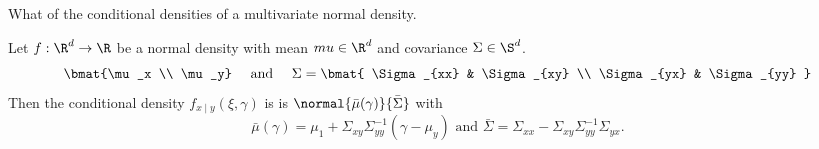 

What of the conditional densities of
a multivariate normal density.


\begin{prop}
  Let $f: \R^d \to \R$ be a normal density with
  mean $mu \in \R^d$ and covariance $\Sigma \in \S^d$.
\[
  \bmat{\mu_x \\ \mu_y} \quad \text{ and } \quad
  \Sigma = \bmat{
    \Sigma_{xx} & \Sigma_{xy} \\
    \Sigma_{yx} & \Sigma_{yy}
  }
\]
  Then the conditional density $f_{x \mid y}(\xi, \gamma)$ is
  is $\normal{\bar{\mu}(\gamma)}{\bar{\Sigma}}$
with
  \[
    \bar{\mu}(\gamma) = \mu_1 + \Sigma_{xy}\Sigma_{yy}^{-1}(\gamma - \mu_y) \text{ and } \bar{\Sigma} = \Sigma_{xx} - \Sigma_{xy}\Sigma_{yy}^{-1}\Sigma_{yx}.
  \]
\end{prop}
